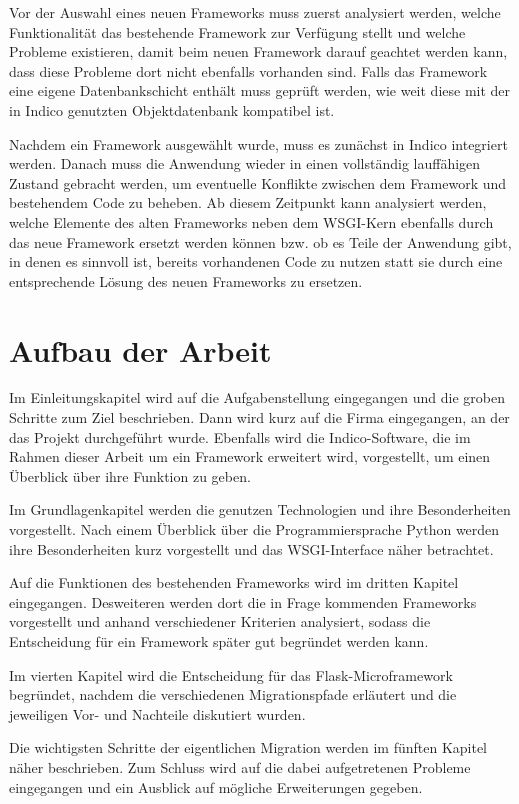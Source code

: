 Vor der Auswahl eines neuen Frameworks muss zuerst analysiert werden, welche Funktionalität das
bestehende Framework zur Verfügung stellt und welche Probleme existieren, damit beim neuen
Framework darauf geachtet werden kann, dass diese Probleme dort nicht ebenfalls vorhanden sind.
Falls das Framework eine eigene Datenbankschicht enthält muss geprüft werden, wie weit diese mit
der in Indico genutzten Objektdatenbank kompatibel ist.

Nachdem ein Framework ausgewählt wurde, muss es zunächst in Indico integriert werden. Danach muss
die Anwendung wieder in einen vollständig lauffähigen Zustand gebracht werden, um eventuelle
Konflikte zwischen dem Framework und bestehendem Code zu beheben. Ab diesem Zeitpunkt kann
analysiert werden, welche Elemente des alten Frameworks neben dem WSGI-Kern ebenfalls durch das neue
Framework ersetzt werden können bzw. ob es Teile der Anwendung gibt, in denen es sinnvoll ist,
bereits vorhandenen Code zu nutzen statt sie durch eine entsprechende Lösung des neuen Frameworks zu
ersetzen.


\section{Aufbau der Arbeit}

Im Einleitungskapitel wird auf die Aufgabenstellung eingegangen und die groben Schritte zum
Ziel beschrieben. Dann wird kurz auf die Firma eingegangen, an der das Projekt durchgeführt
wurde.
Ebenfalls wird die Indico-Software, die im Rahmen dieser Arbeit um ein Framework erweitert wird,
vorgestellt, um einen Überblick über ihre Funktion zu geben.

Im Grundlagenkapitel werden die genutzen Technologien und ihre Besonderheiten vorgestellt. Nach
einem Überblick über die Programmiersprache Python werden ihre Besonderheiten kurz
vorgestellt und das WSGI-Interface näher betrachtet.

Auf die Funktionen des bestehenden Frameworks wird im dritten Kapitel eingegangen. Desweiteren
werden dort die in Frage kommenden Frameworks vorgestellt und anhand verschiedener Kriterien
analysiert, sodass die Entscheidung für ein Framework später gut begründet werden kann.

Im vierten Kapitel wird die Entscheidung für das Flask-Microframework begründet, nachdem die
verschiedenen Migrationspfade erläutert und die jeweiligen Vor- und Nachteile diskutiert wurden.

Die wichtigsten Schritte der eigentlichen Migration werden im fünften Kapitel näher beschrieben. Zum
Schluss wird auf die dabei aufgetretenen Probleme eingegangen und ein Ausblick auf mögliche
Erweiterungen gegeben.

